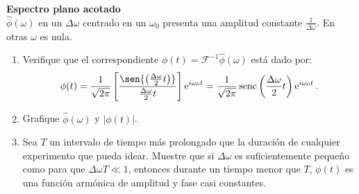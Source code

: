 
\item
\textbf{Espectro plano acotado}\\ 
\(\hat{\phi }(\omega)\) en un $\Delta\omega$ centrado en un $\omega_0$ presenta una amplitud constante $\frac{1}{\Delta \omega}$. 
En otras $\omega$ es nula.
\begin{enumerate}
	\item
	Verifique que el correspondiente $\phi(t) = \mathcal{F}^{-1} \hat{\phi }(\omega)$ está dado por:
	$$
		\phi(t)
		= \frac{1}{\sqrt{2 \pi}} \left[ \frac{ \sen{ \left( \frac{\Delta \omega}{2} t \right) } }{\frac{\Delta \omega}{2} t} \right] \operatorname{e}^{i \omega_0 t}
		= \frac{1}{\sqrt{2 \pi}} \operatorname{senc} \left( \frac{\Delta \omega}{2} t \right) \operatorname{e}^{i \omega_0 t}.
	$$
	\item
	Grafique $\hat{\phi }(\omega)$ y $\left|\phi(t)\right|$.
	\item 
	Sea $T$ un intervalo de tiempo más prolongado que la duración de cualquier experimento que pueda idear.
	Muestre que si $\Delta \omega$ es suficientemente pequeño como para que $\Delta \omega T \ll 1$, entonces durante un tiempo menor que $T$, $\phi(t)$ es una función armónica de amplitud y fase casi constantes.
\end{enumerate}



